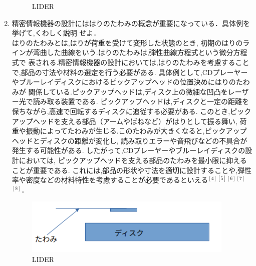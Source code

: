\documentclass[a4paper,12pt]{jsarticle}
\begin{document}
\begin{enumerate}
\begin{figure}[h]
  \centering
  \caption{LIDER}
\end{figure}
\clearpage
\item 精密情報機器の設計にははりのたわみの概念が重要になっている．具体例を挙げて,くわしく説明
せよ．\\
\quad はりのたわみとは,はりが荷重を受けて変形した状態のとき,
初期のはりのラインが湾曲した曲線をいう.はりのたわみは,弾性曲線方程式という微分方程式で
表される.精密情報機器の設計においては,はりのたわみを考慮することで,部品の寸法や材料の選定を行う必要がある.
具体例として,CDプレーヤーやブルーレイディスクにおけるピックアップヘッドの位置決めにはりのたわみが
関係している.ピックアップヘッドは,ディスク上の微細な凹凸をレーザー光で読み取る装置である.
ピックアップヘッドは,ディスクと一定の距離を保ちながら,高速で回転するディスクに追従する必要がある.
このとき,ピックアップヘッドを支える部品（アームやばねなど）がはりとして振る舞い,
荷重や振動によってたわみが生じる.このたわみが大きくなると,ピックアップヘッドとディスクの距離が変化し,
読み取りエラーや音飛びなどの不具合が発生する可能性がある.
したがって,CDプレーヤーやブルーレイディスクの設計においては,
ピックアップヘッドを支える部品のたわみを最小限に抑えることが重要である.
これには,部品の形状や寸法を適切に設計することや,弾性率や密度などの材料特性を考慮することが必要であるといえる$^{[4]}$$^{[5]}$$^{[6]}$$^{[7]}$$^{[8]}$．
\begin{figure}[h]
  \centering
  \includegraphics[width=10cm]{8.png}
  \caption{LIDER}
\end{figure}

\end{enumerate}
\end{document}
